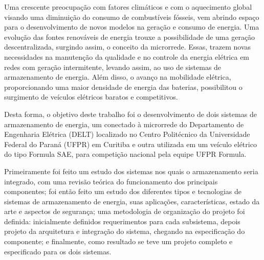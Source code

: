 \begin{resumo}

Uma crescente preocupação com fatores climáticos e com o aquecimento global visando uma diminuição do consumo de combustíveis fósseis, vem abrindo espaço para o desenvolvimento de novos modelos na geração e consumo de energia. Uma evolução das fontes renováveis de energia trouxe a possibilidade de uma geração descentralizada, surgindo assim, o conceito da microrrede. Essas, trazem novas necessidades na manutenção da qualidade e no controle da energia elétrica em redes com geração intermitente, levando assim, ao uso de sistemas de armazenamento de energia. Além disso, o avanço na mobilidade elétrica, proporcionando uma maior densidade de energia das baterias, possibilitou o surgimento de veículos elétricos baratos e competitivos.

Desta forma, o objetivo deste trabalho foi o desenvolvimento de dois sistemas de armazenamento de energia, um conectado à microrrede do Departamento de Engenharia Elétrica (DELT) localizado no Centro Politécnico da Universidade Federal do Paraná (UFPR) em Curitiba e outra utilizada em um veículo elétrico do tipo Formula SAE, para competição nacional pela equipe UFPR Formula.

Primeiramente foi feito um estudo dos sistemas nos quais o armazenamento seria integrado, com uma revisão teórica do funcionamento dos principais componentes; foi então feito um estudo dos diferentes tipos e tecnologias de sistemas de armazenamento de energia, suas aplicações, características, estado da arte e aspectos de segurança; uma metodologia de organização do projeto foi definida: inicialmente definidos requerimentos para cada subsistema, depois projeto da arquitetura e integração do sistema, chegando na especificação do componente; e finalmente, como resultado se teve um projeto completo e especificado para os dois sistemas.

\end{resumo}
